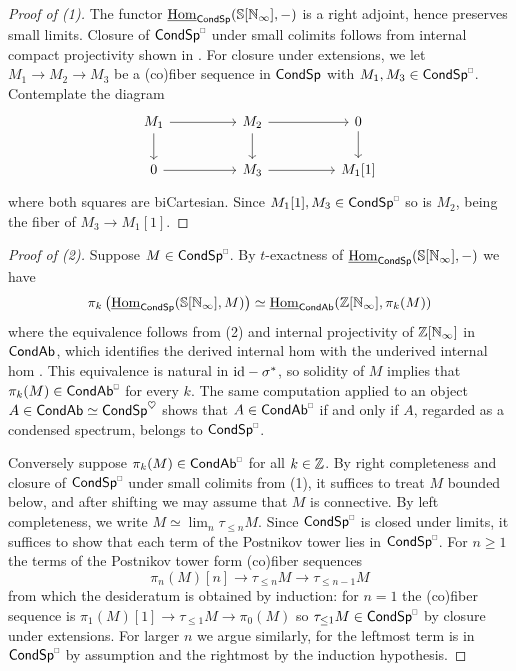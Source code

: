 \begin{proof}[Proof of (1)]
    The functor $\underline{\mathrm{Hom}}_{\mathsf{Cond}\mathsf{Sp}}(\mathbb{S}[\mathbb{N}_{\infty}],-)$ is a right adjoint, hence preserves small limits. Closure of $\Cond\Sp^{\sld}$ under small colimits follows from internal compact projectivity shown in . For closure under extensions, we let $M_{1}\to M_{2}\to M_{3}$ be a (co)fiber sequence in $\mathsf{Cond}\mathsf{Sp}$ with $M_{1},M_{3}\in\Cond\Sp^{\sld}$. Contemplate the diagram 
    $$%
    \begin{tikzcd}
        {M_{1}} && {M_{2}} && 0 \\
        0 && {M_{3}} && {M_{1}[1]}
        \arrow[from=1-1, to=1-3]
        \arrow[from=1-1, to=2-1]
        \arrow[from=1-3, to=1-5]
        \arrow[from=1-3, to=2-3]
        \arrow[from=1-5, to=2-5]
        \arrow[from=2-1, to=2-3]
        \arrow[from=2-3, to=2-5]
    \end{tikzcd}$$
    where both squares are biCartesian. Since $M_{1}[1],M_{3}\in\Cond\Sp^{\sld}$ so is $M_{2}$, being the fiber of $M_{3}\to M_{1}[1]$. 
\end{proof}
\begin{proof}[Proof of (2)]
    Suppose $M\in\Cond\Sp^{\sld}$. By $t$-exactness of $\underline{\mathrm{Hom}}_{\mathsf{Cond}\mathsf{Sp}}(\mathbb{S}[\mathbb{N}_{\infty}],-)$ we have 
    $$\pi_{k}\left(\underline{\mathrm{Hom}}_{\mathsf{Cond}\mathsf{Sp}}(\mathbb{S}[\mathbb{N}_{\infty}],M)\right)\simeq\underline{\mathrm{Hom}}_{\mathsf{Cond}\mathsf{Ab}}(\mathbb{Z}[\mathbb{N}_{\infty}],\pi_{k}(M))$$
    where the equivalence follows from  (2) and internal projectivity of $\mathbb{Z}[\mathbb{N}_{\infty}]$ in $\mathsf{Cond}\mathsf{Ab}$, which identifies the derived internal hom with the underived internal hom \cite[Thm. 2.3.3 \& Rmk. 3.2.2]{CamargoSolid}. This equivalence is natural in $\mathrm{id}-\sigma^{*}$, so solidity of $M$ implies that $\pi_{k}(M)\in\Cond\Ab^{\sld}$ for every $k$. The same computation applied to an object $A\in\mathsf{Cond}\mathsf{Ab}\simeq\mathsf{Cond}\mathsf{Sp}^{\heartsuit}$ shows that $A\in\Cond\Ab^{\sld}$ if and only if $A$, regarded as a condensed spectrum, belongs to $\Cond\Sp^{\sld}$.

    Conversely suppose $\pi_{k}(M)\in\Cond\Ab^{\sld}$ for all $k\in \mathbb{Z}$. By right completeness and closure of $\Cond\Sp^{\sld}$ under small colimits from (1), it suffices to treat $M$ bounded below, and after shifting we may assume that $M$ is connective. By left completeness, we write $M\simeq\lim_{n}\tau_{\leq n}M$. Since $\Cond\Sp^{\sld}$ is closed under limits, it suffices to show that each term of the Postnikov tower lies in $\Cond\Sp^{\sld}$. For $n\geq 1$ the terms of the Postnikov tower form (co)fiber sequences 
    $$\pi_{n}(M)[n]\to\tau_{\leq n}M\to\tau_{\leq n-1}M$$
    from which the desideratum is obtained by induction: for $n=1$ the (co)fiber sequence is $\pi_{1}(M)[1]\to\tau_{\leq 1}M\to\pi_{0}(M)$ so $\tau_{\leq 1}M\in\Cond\Sp^{\sld}$ by closure under extensions. For larger $n$ we argue similarly, for the leftmost term is in $\Cond\Sp^{\sld}$ by assumption and the rightmost by the induction hypothesis. 
\end{proof}
